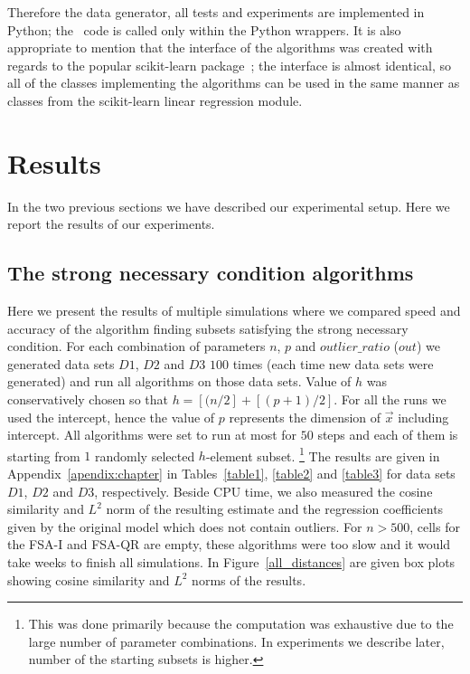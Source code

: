 Therefore the data generator, all tests and experiments are implemented in Python; the \CC \  code is called only within the Python wrappers. It is also appropriate to mention that the interface of the algorithms was created with regards to the popular scikit-learn package~\cite{scikit-learn}; the interface is almost identical, so all of the classes implementing the algorithms can be used in the same manner as classes from the scikit-learn linear regression module.


\section{Results}
In the two previous sections we have described our experimental setup. Here we report the results of our experiments.

\subsection{The strong necessary condition algorithms} \label{strong:experiments}
Here we present the results of multiple simulations where we compared speed and accuracy of the algorithm finding subsets satisfying the strong necessary condition. For each combination of parameters $n$, $p$ and $outlier\_ratio$ ($out$) we generated data sets  $D1$, $D2$ and $D3$ $100$ times (each time new data sets were generated) and run all algorithms on those data sets. Value of $h$ was conservatively chosen so that $h = [(n/2] + [(p+1)/2]$. For all the runs we used the intercept, hence the value of $p$ represents the dimension of $\vec{x}$ including intercept. All algorithms were set to run at most for $50$ steps and each of them is starting from $1$ randomly selected $h$-element subset.
\footnote{This was done primarily because the computation was exhaustive due to the large number of parameter combinations. In experiments we describe later, number of the starting subsets is higher.}
The results are given in Appendix~\ref{apendix:chapter} in Tables~\ref{table1}, \ref{table2} and \ref{table3} for data sets $D1$, $D2$ and $D3$, respectively. Beside CPU time, we also measured the cosine similarity and $L^2$ norm of the resulting estimate and the regression coefficients given by the original model which does not contain outliers. For $n > 500$, cells for the FSA-I and FSA-QR are empty, these algorithms were too slow and it would take weeks to finish all simulations.
In Figure~\ref{all_distances} are given box plots showing cosine similarity and $L^2$ norms of the results. 

